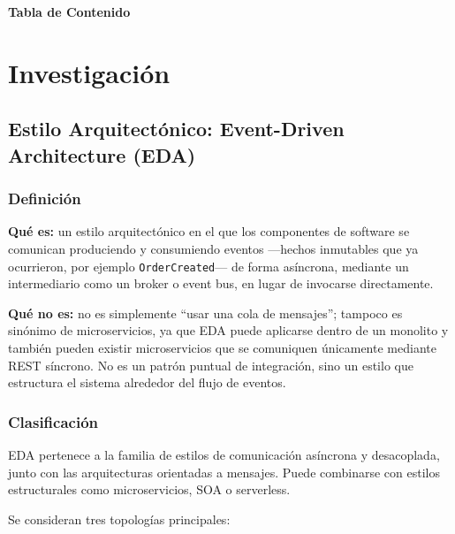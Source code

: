 \documentclass[12pt,a4paper]{article}
\begin{document}
\thispagestyle{empty}
\begin{center}
    {\LARGE\bfseries Tabla de Contenido}
\end{center}
\vspace{0.5cm}
\tableofcontents
\clearpage
\setcounter{page}{1}

\section{Investigación}

\subsection{Estilo Arquitectónico: Event-Driven Architecture (EDA)}

\subsubsection{Definición}

\textbf{Qué es:} un estilo arquitectónico en el que los componentes de software se comunican produciendo y consumiendo eventos ---hechos inmutables que ya ocurrieron, por ejemplo \texttt{OrderCreated}--- de forma asíncrona, mediante un intermediario como un broker o event bus, en lugar de invocarse directamente.

\textbf{Qué no es:} no es simplemente ``usar una cola de mensajes''; tampoco es sinónimo de microservicios, ya que EDA puede aplicarse dentro de un monolito y también pueden existir microservicios que se comuniquen únicamente mediante REST síncrono. No es un patrón puntual de integración, sino un estilo que estructura el sistema alrededor del flujo de eventos.

\subsubsection{Clasificación}

EDA pertenece a la familia de estilos de comunicación asíncrona y desacoplada, junto con las arquitecturas orientadas a mensajes. Puede combinarse con estilos estructurales como microservicios, SOA o serverless.

Se consideran tres topologías principales:
\end{document}
